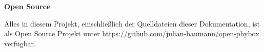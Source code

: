 \clearpage
\vspace*{\fill}
\LARGE{\textbf{Open Source}}\\[1ex]
\normalsize

Alles in diesem Projekt, einschließlich der Quelldateien dieser Dokumentation, ist als Open Source Projekt unter \url{https://github.com/julian-baumann/open-phybox} verfügbar.